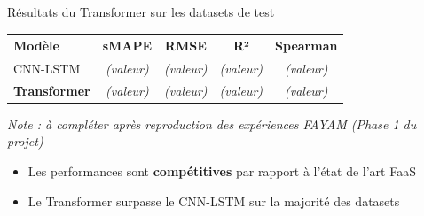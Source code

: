 \documentclass[10pt]{beamer}
\begin{document}
\begin{frame}{Résultats du Transformer sur les datasets de test}
	\begin{tcolorbox}[
		colback=blue!3,
		colframe=blue!40!black,
		arc=3mm,
		boxrule=0.8pt,
		fonttitle=\bfseries,
		title={Métriques de performance (phase test --- FAYAM, 2024)}
		]
		\begin{tabular}{lcccc}
			\toprule
			\textbf{Modèle} & \textbf{sMAPE} & \textbf{RMSE} & \textbf{R²} & \textbf{Spearman} \\
			\midrule
			CNN-LSTM        & \textit{(valeur)} & \textit{(valeur)} & \textit{(valeur)} & \textit{(valeur)} \\
			\textbf{Transformer} & \textit{(valeur)} & \textit{(valeur)} & \textit{(valeur)} & \textit{(valeur)} \\
			\bottomrule
		\end{tabular}
		
		\vspace{6pt}
		{\small \textit{Note : à compléter après reproduction des expériences FAYAM (Phase 1 du projet)}}
	\end{tcolorbox}
	
	\vspace{10pt}
	
	\begin{tcolorbox}[
		colback=gray!3,
		colframe=gray!50!black,
		arc=3mm,
		boxrule=0.8pt,
		fonttitle=\bfseries,
		title={Interprétation}
		]
		\begin{itemize}
			\item Les performances sont \textbf{compétitives} par rapport à l'état de l'art FaaS
			\item Le Transformer surpasse le CNN-LSTM sur la majorité des datasets
		\end{itemize}
	\end{tcolorbox}
\end{frame}
\end{document}
